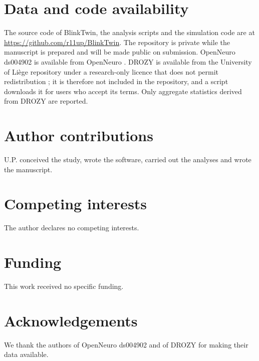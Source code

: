 \section*{Data and code availability}
The source code of BlinkTwin, the analysis scripts and the simulation code are at \url{https://github.com/r11up/BlinkTwin}. The repository is private while the manuscript is prepared and will be made public on submission. OpenNeuro ds004902 is available from OpenNeuro \citep{xiang2024ds004902}. DROZY is available from the University of Li\`ege repository under a research-only licence that does not permit redistribution \citep{massoz2016ulg}; it is therefore not included in the repository, and a script downloads it for users who accept its terms. Only aggregate statistics derived from DROZY are reported.

\section*{Author contributions}
U.P. conceived the study, wrote the software, carried out the analyses and wrote the manuscript.

\section*{Competing interests}
The author declares no competing interests.

\section*{Funding}
This work received no specific funding.

\section*{Acknowledgements}
We thank the authors of OpenNeuro ds004902 and of DROZY for making their data available.

